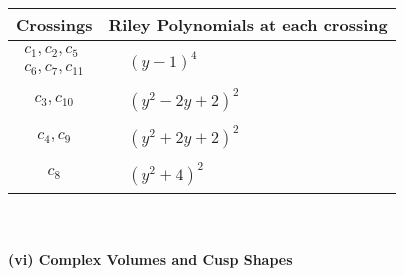 \documentclass[1p]{elsarticle_modified}
\theoremstyle{definition}
\begin{document}
\begin{tabular}{m{50pt}|m{274pt}}
Crossings & \hspace{64pt}Riley Polynomials at each crossing \\
\hline $$\begin{aligned}c_{1},c_{2},c_{5}\\c_{6},c_{7},c_{11}\end{aligned}$$&$\begin{aligned}
&(y-1)^4
\end{aligned}$\\
\hline $$\begin{aligned}c_{3},c_{10}\end{aligned}$$&$\begin{aligned}
&(y^2-2 y+2)^2
\end{aligned}$\\
\hline $$\begin{aligned}c_{4},c_{9}\end{aligned}$$&$\begin{aligned}
&(y^2+2 y+2)^2
\end{aligned}$\\
\hline $$\begin{aligned}c_{8}\end{aligned}$$&$\begin{aligned}
&(y^2+4)^2
\end{aligned}$\\
\hline
\end{tabular}\\~\\
\newpage\flushleft \textbf{(vi) Complex Volumes and Cusp Shapes}
\end{document}
